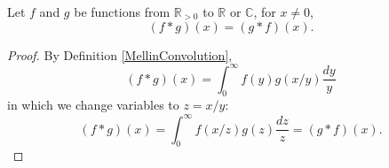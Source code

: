 \begin{lemma}[MellinConvolutionSymmetric]
\label{MellinConvolutionSymmetric}
\leanok
Let $f$ and $g$ be functions from $\mathbb{R}_{>0}$ to $\mathbb{R}$ or $\mathbb{C}$, for $x\neq0$,
  $$
    (f\ast g)(x)=(g\ast f)(x)
    .
  $$
\end{lemma}
\begin{proof}
\leanok
By Definition \ref{MellinConvolution},
  $$
    (f\ast g)(x) = \int_0^\infty f(y)g(x/y)\frac{dy}{y}
  $$
  in which we change variables to $z=x/y$:
  $$
    (f\ast g)(x) = \int_0^\infty f(x/z)g(z)\frac{dz}{z}
    =(g\ast f)(x)
    .
  $$
\end{proof}
